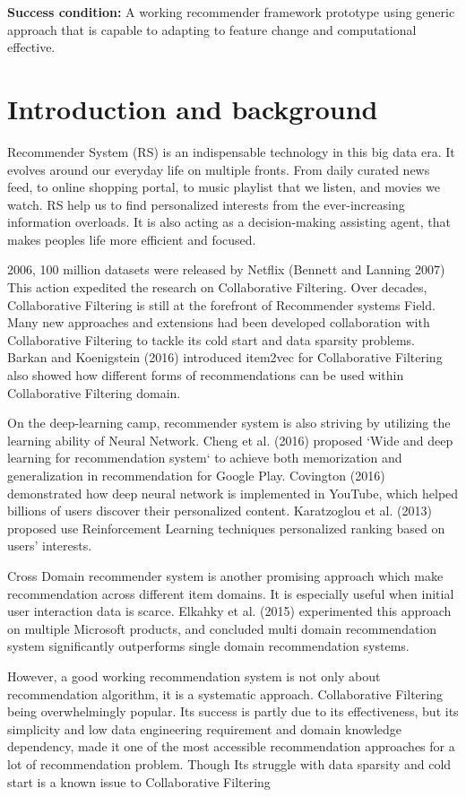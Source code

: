\documentclass[12pt,a4 paper,title page]{article}
\begin{document}
\textbf{Success condition:} A working recommender framework prototype using generic approach that is capable to  adapting to feature change and computational effective.  

\newpage

\section{Introduction and background}
Recommender System (RS) is an indispensable technology in this big data era. It evolves around our everyday life on multiple fronts. From daily curated news feed, to online shopping portal, to music playlist that we listen, and movies we watch. RS help us to find personalized interests from the ever-increasing information overloads. It is also acting as a decision-making assisting agent, that makes peoples life more efficient and focused. 

2006, 100 million datasets were released by Netflix (Bennett and Lanning 2007) This action expedited the research on Collaborative Filtering. Over decades, Collaborative Filtering is still at the forefront of Recommender systems Field. Many new approaches and extensions had been developed collaboration with Collaborative Filtering to tackle its cold start and data sparsity problems. Barkan and Koenigstein (2016) introduced item2vec for Collaborative Filtering also showed how different forms of recommendations can be used within Collaborative Filtering domain. 

On the deep-learning camp, recommender system is also striving by utilizing the learning ability of Neural Network. Cheng et al. (2016) proposed `Wide and deep learning for recommendation system` to achieve both memorization and generalization in recommendation for Google Play. Covington (2016) demonstrated how deep neural network is implemented in YouTube, which helped billions of users discover their personalized content. Karatzoglou et al. (2013) proposed use Reinforcement Learning techniques personalized ranking based on users’ interests.  

Cross Domain recommender system is another promising approach which make recommendation across different item domains. It is especially useful when initial user interaction data is scarce. Elkahky et al. (2015) experimented this approach on multiple Microsoft products, and concluded multi domain recommendation system significantly outperforms single domain recommendation systems. 

However, a good working recommendation system is not only about recommendation algorithm, it is a systematic approach.  Collaborative Filtering being overwhelmingly popular. Its success is partly due to its effectiveness, but its simplicity and low data engineering requirement and domain knowledge dependency, made it one of the most accessible recommendation approaches for a lot of recommendation problem. Though Its struggle with data sparsity and cold start is a known issue to Collaborative Filtering 
\end{document}
